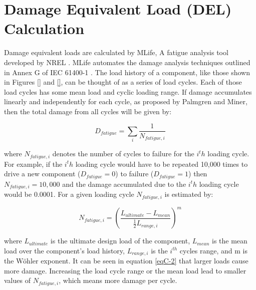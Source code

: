 
\chapter{Damage Equivalent Load (DEL) Calculation} %

\label{AppendixC} %


Damage equivalent loads are calculated by MLife, A fatigue analysis tool developed by NREL \cite{hayman2012,hayman2012a}. MLife automates the damage analysis techniques outlined in Annex G of IEC 61400-1 \cite{IEC2005}. The load history of a component, like those shown in Figures \ref{} and \ref{}, can be thought of as a series of load cycles. Each of those load cycles has some mean load and cyclic loading range. If damage accumulates linearly and independently for each cycle, as proposed by Palmgren \cite{palmgren1924} and Miner\cite{miner1945}, then the total damage from all cycles will be given by:

\begin{equation}
D_{fatigue} = \sum_{i} \frac{1}{N_{fatigue, i}} \label{eqC-1}
\end{equation}

where $N_{fatigue, i}$ denotes the number of cycles to failure for the $i^th$ loading cycle. For example, if the $i^th$ loading cycle would have to be repeated 10,000 times to drive a new component ($D_{fatigue} = 0$) to failure ($D_{fatigue} = 1$) then $N_{fatigue, i} = 10,000$ and the damage accumulated due to the $i^th$ loading cycle would be 0.0001. For a given loading cycle $N_{fatigue, i}$ is estimated by:

\begin{equation}
N_{fatigue, i} = \left ( \frac{L_{ultimate}-L_{mean}}{\frac{1}{2}L_{range,i}} \right )^m \label{eqC-2}
\end{equation}

where $L_{ultimate}$ is the ultimate design load of the component, $L_{mean}$ is the mean load over the component's load history, $L_{range,i}$ is the $i^{th}$ cycles range, and m is the W\"{o}hler exponent. It can be seen in equation \ref{eqC-2} that larger loads cause more damage. Increasing the load cycle range or the mean load lead to smaller values of $N_{fatigue, i}$, which means more damage per cycle.  

